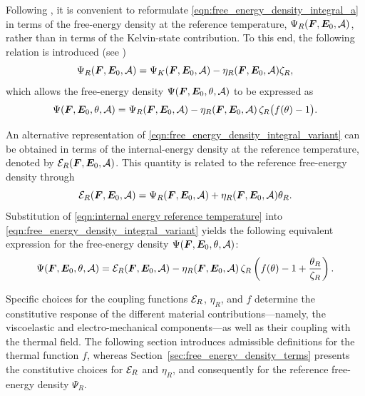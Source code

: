 Following \cite{BonetGil2026}, it is convenient to reformulate
\eqref{eqn:free_energy_density_integral_a} in terms of the free-energy
density at the reference temperature,
$\Psi_R(\boldsymbol{F},\boldsymbol{E}_0,\mathcal{A})$, rather than in terms of the Kelvin-state
contribution. To this end, the following relation is introduced (see
\cite{BonetGil2026})
%
\begin{equation}\label{eqn:kelvin energy}
	\Psi_R(\boldsymbol{F},\boldsymbol{E}_0,\mathcal{A})
	=
	\Psi_K(\boldsymbol{F},\boldsymbol{E}_0,\mathcal{A})
	-
	\eta_R(\boldsymbol{F},\boldsymbol{E}_0,\mathcal{A})\zeta_R,
\end{equation}
%
which allows the free-energy density
$\Psi(\boldsymbol{F},\boldsymbol{E}_0,\theta,\mathcal{A})$ to be expressed as
%
\begin{equation}\label{eqn:free_energy_density_integral_variant}
	\Psi(\boldsymbol{F},\boldsymbol{E}_0,\theta,\mathcal{A})
	=
	\Psi_R(\boldsymbol{F},\boldsymbol{E}_0,\mathcal{A})
	-
	\eta_R(\boldsymbol{F},\boldsymbol{E}_0,\mathcal{A})\,\zeta_R
	\bigl(f(\theta)-1\bigr).
\end{equation}


An alternative representation of
\eqref{eqn:free_energy_density_integral_variant} can be obtained in
terms of the internal-energy density at the reference temperature,
denoted by $\mathcal{E}_R(\boldsymbol{F},\boldsymbol{E}_0,\mathcal{A})$. This quantity is related to the
reference free-energy density through
%
\begin{equation*}\label{eqn:internal energy reference temperature}
	\mathcal{E}_R(\boldsymbol{F},\boldsymbol{E}_0,\mathcal{A})
	=
	\Psi_R(\boldsymbol{F},\boldsymbol{E}_0,\mathcal{A})
	+
	\eta_R(\boldsymbol{F},\boldsymbol{E}_0,\mathcal{A})\theta_R.
\end{equation*}
%
Substitution of
\eqref{eqn:internal energy reference temperature} into
\eqref{eqn:free_energy_density_integral_variant} yields the following
equivalent expression for the free-energy density
$\Psi(\boldsymbol{F},\boldsymbol{E}_0,\theta,\mathcal{A})$:
%
\begin{equation}\label{eqn:free_energy_density_integral_variant 2}
	\Psi(\boldsymbol{F},\boldsymbol{E}_0,\theta,\mathcal{A})
	=
	\mathcal{E}_R(\boldsymbol{F},\boldsymbol{E}_0,\mathcal{A})
	-
	\eta_R(\boldsymbol{F},\boldsymbol{E}_0,\mathcal{A})\,\zeta_R
	\left(
	f(\theta)-1+\frac{\theta_R}{\zeta_R}
	\right).
\end{equation}
%

Specific choices for the coupling functions
$\mathcal{E}_R$, $\eta_R$, and $f$ determine the constitutive response of the
different material contributions---namely, the viscoelastic and
electro-mechanical components---as well as their coupling with the
thermal field. The following section introduces admissible definitions
for the thermal function $f$, whereas
Section~\ref{sec:free_energy_density_terms} presents the constitutive
choices for $\mathcal{E}_R$ and $\eta_R$, and consequently for the reference
free-energy density $\Psi_R$.
%



